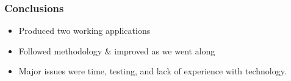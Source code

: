 \documentclass[10pt, compress]{beamer}
\begin{document}
\begin{frame}[fragile]
  \frametitle{Conclusions}
  
  	\begin{itemize}
		\item Produced two working applications
		\item Followed methodology \& improved as we went along
		\item Major issues were time, testing, and lack of experience with technology.
	\end{itemize}

\end{frame}


\end{document}

